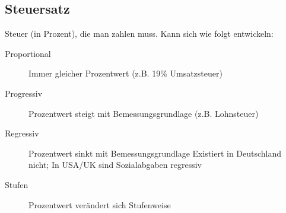\documentclass{beamer}
\begin{document}
%	
	
		\subsection{Steuersatz}
		
			\begin{frame}
				Steuer (in Prozent), die man zahlen muss. Kann sich wie folgt entwickeln:\n
				\begin{description}
					\item[Proportional] Immer gleicher Prozentwert (z.B. 19\% Umsatzsteuer)
					\item[Progressiv] Prozentwert steigt mit Bemessungsgrundlage (z.B. Lohnsteuer)
					\item[Regressiv] Prozentwert sinkt mit Bemessungsgrundlage \vspace{0.1cm}\newline
					{\tiny Existiert in Deutschland nicht; In USA/UK sind Sozialabgaben regressiv\\}
					\item[Stufen] Prozentwert verändert sich Stufenweise
				\end{description}
			\end{frame}
	
\end{document}
